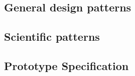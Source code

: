 \subsection{General design patterns}\label{sec:genpat}

\clearpage
\subsection{Scientific patterns}\label{sec:scipat}

\clearpage

\clearpage

\clearpage
\subsection{Prototype Specification}\label{sec:proto}

